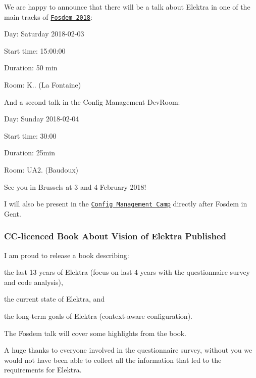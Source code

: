 We are happy to announce that there will be a talk about Elektra in one of the main tracks of \href{https://fosdem.org/2018}{\tt Fosdem 2018}\+:


\begin{DoxyItemize}
\item Day\+: Saturday 2018-\/02-\/03
\item Start time\+: 15\+:00\+:00
\item Duration\+: 50 min
\item Room\+: K.. (La Fontaine)
\end{DoxyItemize}

And a second talk in the Config Management Dev\+Room\+:


\begin{DoxyItemize}
\item Day\+: Sunday 2018-\/02-\/04
\item Start time\+: 30\+:00
\item Duration\+: 25min
\item Room\+: U\+A2. (Baudoux)
\end{DoxyItemize}

See you in Brussels at 3 and 4 February 2018!

I will also be present in the \href{http://cfgmgmtcamp.eu/}{\tt Config Management Camp} directly after Fosdem in Gent.

\subsubsection*{C\+C-\/licenced Book About Vision of Elektra Published}

I am proud to release a book describing\+:


\begin{DoxyItemize}
\item the last 13 years of Elektra (focus on last 4 years with the questionnaire survey and code analysis),
\item the current state of Elektra, and
\item the long-\/term goals of Elektra (context-\/aware configuration).
\end{DoxyItemize}

The Fosdem talk will cover some highlights from the book.

A huge thanks to everyone involved in the questionnaire survey, without you we would not have been able to collect all the information that led to the requirements for Elektra.

